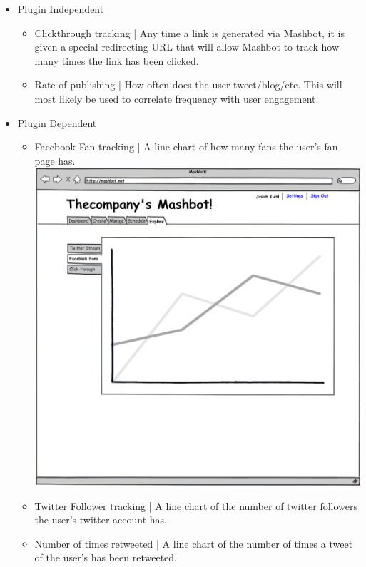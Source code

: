 \documentclass{report}
\begin{document}
\begin{itemize}
\item Plugin Independent
  \begin{itemize}
  \item Clickthrough tracking | Any time a link is generated via Mashbot, it is given a special redirecting URL that will allow Mashbot to track how many times the link has been clicked.
  \item Rate of publishing | How often does the user tweet/blog/etc. This will most likely be used to correlate frequency with user engagement.
  \end{itemize}
\item Plugin Dependent
  \begin{itemize}
  \item Facebook Fan tracking | A line chart of how many fans the user's fan page has.
    \includegraphics[width=\textwidth]{../mockups/explore-facebook.png}
  \item Twitter Follower tracking | A line chart of the number of twitter followers the user's twitter account has.
  \item Number of times retweeted | A line chart of the number of times a tweet of the user's has been retweeted.
  \end{itemize}
\end{itemize}
\end{document}
